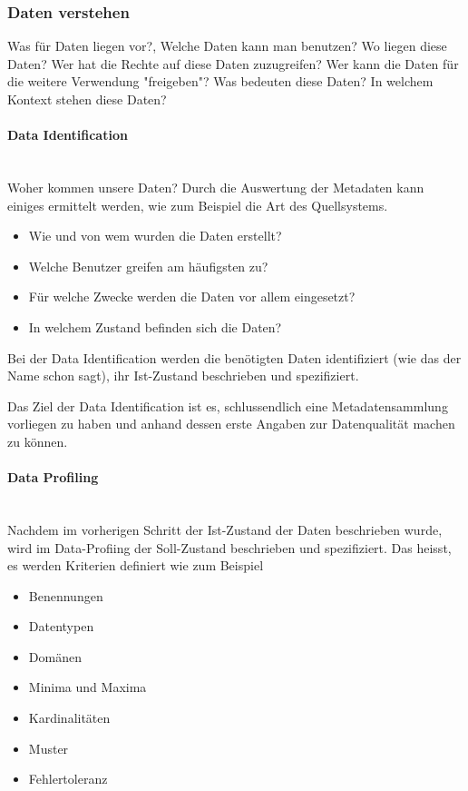 \documentclass[a4paper, 11pt]{article}
\begin{document}
\subsubsection{Daten verstehen}
Was für Daten liegen vor?, Welche Daten kann man benutzen? Wo liegen diese Daten? Wer hat die Rechte auf diese Daten zuzugreifen? Wer kann die Daten für die weitere Verwendung "freigeben"? Was bedeuten diese Daten? In welchem Kontext stehen diese Daten?

\paragraph{Data Identification}\mbox{}\\
Woher kommen unsere Daten? Durch die Auswertung der Metadaten kann einiges ermittelt werden, wie zum Beispiel die Art des Quellsystems.

\begin{itemize}
	\item Wie und von wem wurden die Daten erstellt?
	\item Welche Benutzer greifen am häufigsten zu?
	\item Für welche Zwecke werden die Daten vor allem eingesetzt?
	\item In welchem Zustand befinden sich die Daten?	
\end{itemize}

Bei der Data Identification werden die benötigten Daten identifiziert (wie das der Name schon sagt), ihr Ist-Zustand beschrieben und spezifiziert. 

Das Ziel der Data Identification ist es, schlussendlich eine Metadatensammlung vorliegen zu haben und anhand dessen erste Angaben zur Datenqualität machen zu können.

\paragraph{Data Profiling} \mbox{}\\
Nachdem im vorherigen Schritt der Ist-Zustand der Daten beschrieben wurde, wird im Data-Profiing der Soll-Zustand beschrieben und spezifiziert. Das heisst, es werden Kriterien definiert wie zum Beispiel

\begin{itemize}
	\item Benennungen
	\item Datentypen
	\item Domänen
	\item Minima und Maxima
	\item Kardinalitäten
	\item Muster
	\item Fehlertoleranz
\end{itemize}
\end{document}
